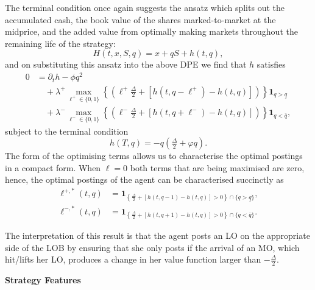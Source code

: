 \documentclass[11pt, a4paper]{book}
\newcommand{\Ind}{\mathbf{1}}
\begin{document}
	The terminal condition once again suggests the ansatz which splits out the accumulated cash, the book value of the shares marked-to-market at the midprice, and the added value from optimally making markets throughout the remaining life of the strategy:
	\[
	H(t, x, S, q) = x + q S + h(t, q),
	\]
	and on substituting this ansatz into the above DPE we find that $h$ satisfies
	\begin{align*}
		0 &= \partial_t h - \phi q^2 \\
		&\quad + \lambda^+ \max_{\ell^+ \in \{0,1\}} \left\{ \left( \ell^+ \tfrac{\Delta}{2} + \left[ h(t, q - \ell^+) - h(t, q) \right] \right) \right\} \Ind_{q > \underline{q}} \\
		&\quad + \lambda^- \max_{\ell^- \in \{0,1\}} \left\{ \left( \ell^- \tfrac{\Delta}{2} + \left[ h(t, q + \ell^-) - h(t, q) \right] \right) \right\} \Ind_{q < \bar{q}},
	\end{align*}
	subject to the terminal condition
	\[
	h(T, q) = -q \left(\tfrac{\Delta}{2} + \varphi q\right).
	\]
	The form of the optimising terms allows us to characterise the optimal postings in a compact form. When $\ell = 0$ both terms that are being maximised are zero, hence, the optimal postings of the agent can be characterised succinctly as
	\begin{equation}
		\boxed{
			\begin{aligned}
				\ell^{+, *}(t, q) &= \Ind_{\left\{ \frac{\Delta}{2} + [h(t, q-1) - h(t, q)] > 0 \right\} \cap \{q > \underline{q}\}}, \\
				\ell^{-, *}(t, q) &= \Ind_{\left\{ \frac{\Delta}{2} + [h(t, q+1) - h(t, q)] > 0 \right\} \cap \{q < \bar{q}\}}.
			\end{aligned}
		} \label{eq:10.17}
	\end{equation}
	
	The interpretation of this result is that the agent posts an LO on the appropriate side of the LOB by ensuring that she only posts if the arrival of an MO, which hit/lifts her LO, produces a change in her value function larger than $-\frac{\Delta}{2}$.
	
	\textbf{Strategy Features}
	
\end{document}
